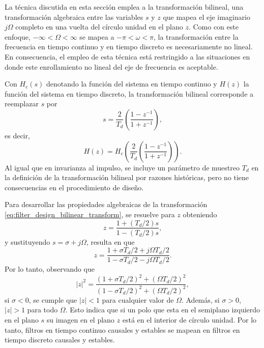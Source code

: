 \documentclass[a4paper]{report}
\begin{document}
La técnica discutida en esta sección emplea a la transformación bilineal, una transformación algebraica entre las variables \(s\) y \(z\) que mapea el eje imaginario \(j\Omega\) completo en una vuelta del círculo unidad en el plano \(z\). Como con este enfoque, \(-\infty<\Omega<\infty\) se mapea a \(-\pi<\omega<\pi\), la transformación entre la frecuencia en tiempo continuo y en tiempo discreto es necesariamente no lineal. En consecuencia, el empleo de esta técnica está restringido a las situaciones en donde este enrollamiento no lineal del eje de frecuencia es aceptable.

Con \(H_c(s)\) denotando la función del sistema en tiempo continuo y \(H(z)\) la función del sistema en tiempo discreto, la transformación bilineal corresponde a reemplazar \(s\) por 
\begin{equation}\label{eq:filter_design_bilinear_transform}
 s=\frac{2}{T_d}\left(\frac{1-z^{-1}}{1+z^{-1}}\right), 
\end{equation}
es decir,
\begin{equation}\label{eq:filter_design_bilinear_transform_Hz}
 H(z)=H_c\left(\frac{2}{T_d}\left(\frac{1-z^{-1}}{1+z^{-1}}\right)\right). 
\end{equation}
Al igual que en invarianza al impulso, se incluye un parámetro de muestreo \(T_d\) en la definición de la transformación bilineal por razones históricas, pero no tiene consecuencias en el procedimiento de diseño.

Para desarrollar las propiedades algebraicas de la transformación \ref{eq:filter_design_bilinear_transform}, se resuelve para \(z\) obteniendo
\begin{equation}\label{eq:filter_design_bilinear_transform_inverse}
 z=\frac{1+(T_d/2)s}{1-(T_d/2)s}, 
\end{equation}
y sustituyendo \(s=\sigma+j\Omega\), resulta en que 
\[
 z=\frac{1+\sigma T_d/2+j\Omega T_d/2}{1-\sigma T_d/2-j\Omega T_d/2}.
\]
Por lo tanto, observando que
\[
 |z|^2=\frac{(1+\sigma T_d/2)^2+(\Omega T_d/2)^2}{(1-\sigma T_d/2)^2+(\Omega T_d/2)^2},
\]
si \(\sigma<0\), se cumple que \(|z|<1\) para cualquier valor de \(\Omega\). Además, si \(\sigma>0\), \(|z|>1\) para todo \(\Omega\). Esto indica que si un polo que esta en el semiplano izquierdo en el plano \(s\) su imagen en el plano \(z\) está en el interior de círculo unidad. Por lo tanto, filtros en tiempo continuo causales y estables se mapean en filtros en tiempo discreto causales y estables.
\end{document}
